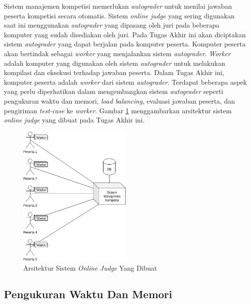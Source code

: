 \par Sistem manajemen kompetisi memerlukan \textit{autograder} untuk menilai jawaban peserta kompetisi secara otomatis. Sistem \textit{online judge} yang sering digunakan saat ini menggunakan \textit{autograder} yang dipasang oleh juri pada beberapa komputer yang sudah disediakan oleh juri. Pada Tugas Akhir ini akan diciptakan sistem \textit{autograder} yang dapat berjalan pada komputer peserta. Komputer peserta akan bertindak sebagai \textit{worker} yang menjalankan sistem \textit{autograder}. \textit{Worker} adalah komputer yang digunakan oleh sistem \textit{autograder} untuk melakukan kompilasi dan eksekusi terhadap jawaban peserta. Dalam Tugas Akhir ini, komputer peserta adalah \textit{worker} dari sistem \textit{autograder}. Terdapat beberapa aspek yang perlu diperhatikan dalam mengembangkan sistem \textit{autograder} seperti pengukuran waktu dan memori, \textit{load balancing}, evaluasi jawaban peserta, dan pengiriman \textit{test-case} ke \textit{worker}. Gambar \ref{fig:architecture-new} menggambarkan arsitektur sistem \textit{online judge} yang dibuat pada Tugas Akhir ini.

\begin{figure}[ht!]
    \centering
    \includegraphics[width=0.5\textwidth]{images/architecture-new}
    \caption{Arsitektur Sistem \textit{Online Judge} Yang Dibuat}
    \label{fig:architecture-new}
\end{figure}

\subsection{Pengukuran Waktu Dan Memori} \label{subsec:time-memory-measure}

